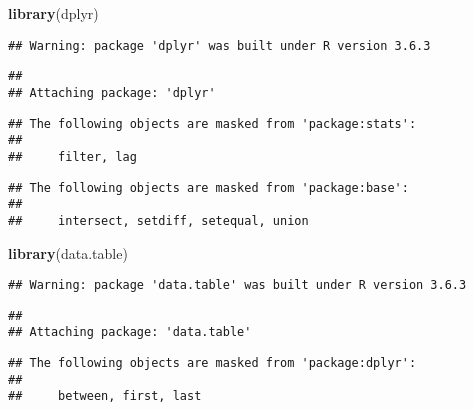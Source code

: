 \documentclass[]{article}
\newenvironment{Shaded}{\begin{snugshade}}{\end{snugshade}}
\newcommand{\DataTypeTok}[1]{\textcolor[rgb]{0.13,0.29,0.53}{#1}}
\newcommand{\KeywordTok}[1]{\textcolor[rgb]{0.13,0.29,0.53}{\textbf{#1}}}
\newcommand{\NormalTok}[1]{#1}
\newcommand{\OperatorTok}[1]{\textcolor[rgb]{0.81,0.36,0.00}{\textbf{#1}}}
\newcommand{\OtherTok}[1]{\textcolor[rgb]{0.56,0.35,0.01}{#1}}
\newcommand{\StringTok}[1]{\textcolor[rgb]{0.31,0.60,0.02}{#1}}
\begin{document}
\begin{Shaded}
\begin{Highlighting}[]
\KeywordTok{library}\NormalTok{(dplyr)}
\end{Highlighting}
\end{Shaded}

\begin{verbatim}
## Warning: package 'dplyr' was built under R version 3.6.3
\end{verbatim}

\begin{verbatim}
## 
## Attaching package: 'dplyr'
\end{verbatim}

\begin{verbatim}
## The following objects are masked from 'package:stats':
## 
##     filter, lag
\end{verbatim}

\begin{verbatim}
## The following objects are masked from 'package:base':
## 
##     intersect, setdiff, setequal, union
\end{verbatim}

\begin{Shaded}
\begin{Highlighting}[]
\KeywordTok{library}\NormalTok{(data.table)}
\end{Highlighting}
\end{Shaded}

\begin{verbatim}
## Warning: package 'data.table' was built under R version 3.6.3
\end{verbatim}

\begin{verbatim}
## 
## Attaching package: 'data.table'
\end{verbatim}

\begin{verbatim}
## The following objects are masked from 'package:dplyr':
## 
##     between, first, last
\end{verbatim}

\begin{Shaded}
\end{Shaded}
\end{document}
